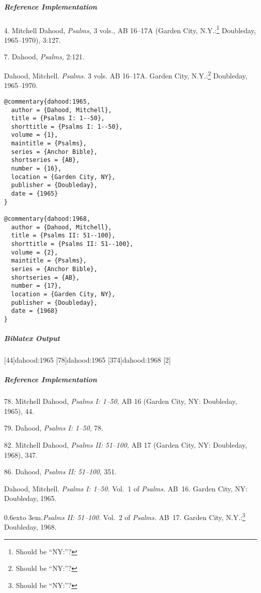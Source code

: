 \documentclass[a4paper]{article}
\newcommand*{\refbibnamedash}{%
  \leavevmode\raise 0.6ex\hbox to 3em{\hrulefill}.\space}
\newenvironment{biboutput}{%
  \subparagraph{Biblatex Output}
}{\color{black}}
\newenvironment{refimp}{%
  \subparagraph{Reference Implementation}
  \color{reference-colour}
  \rm
}{\par\color{black}}
\begin{document}
\begin{refimp}
  \hspace*{\bibindent}4. Mitchell Dahood, \emph{Psalms,} 3 vols., AB 16–17A
  (Garden City, N.Y.:\footnote{Should be “NY:”?} Doubleday, 1965–1970), 3:127.

  \hspace*{\bibindent}7. Dahood, \emph{Psalms,} 2:121.

  \hangindent\bibindent Dahood, Mitchell. \emph{Psalms.} 3 vols. AB 16–17A.
  Garden City, N.Y.:\footnote{Should be “NY:”?} Doubleday, 1965–1970.

\end{refimp}

\medskip

\begin{lstlisting}
@commentary{dahood:1965,
  author = {Dahood, Mitchell},
  title = {Psalms I: 1--50},
  shorttitle = {Psalms I: 1--50},
  volume = {1},
  maintitle = {Psalms},
  series = {Anchor Bible},
  shortseries = {AB},
  number = {16},
  location = {Garden City, NY},
  publisher = {Doubleday},
  date = {1965}
}

@commentary{dahood:1968,
  author = {Dahood, Mitchell},
  title = {Psalms II: 51--100},
  shorttitle = {Psalms II: 51--100},
  volume = {2},
  maintitle = {Psalms},
  series = {Anchor Bible},
  shortseries = {AB},
  number = {17},
  location = {Garden City, NY},
  publisher = {Doubleday},
  date = {1968}
}
\end{lstlisting}

\begin{biboutput}
  [44]{dahood:1965}
  [78]{dahood:1965}
  [374]{dahood:1968}
  [2]{%
    }
\end{biboutput}

\begin{refimp}
  \hspace*{\bibindent}78. Mitchell Dahood, \emph{Psalms I: 1–50,} AB 16
  (Garden City, NY: Doubleday, 1965), 44.

  \hspace*{\bibindent}79. Dahood, \emph{Psalms I: 1–50,} 78.

  \hspace*{\bibindent}82. Mitchell Dahood, \emph{Psalms II: 51–100,} AB 17
  (Garden City, NY: Doubleday, 1968), 347.

  \hspace*{\bibindent}86. Dahood, \emph{Psalms II: 51–100,} 351.

  \hangindent\bibindent Dahood, Mitchell. \emph{Psalms I: 1–50.} Vol.~1 of
  \emph{Psalms.} AB~16. Garden City, NY: Doubleday, 1965.

  \hangindent\bibindent\refbibnamedash \emph{Psalms II: 51–100.} Vol.~2 of
  \emph{Psalms.} AB~17. Garden City, N.Y.:\footnote{Should be “NY:”?}
  Doubleday, 1968.

\end{refimp}
\end{document}
